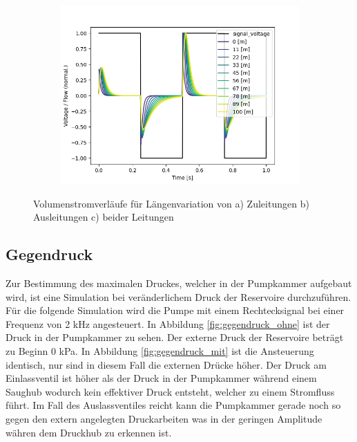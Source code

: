 \documentclass[fontsize=12pt, a4paper]{scrartcl}
\begin{document}
\begin{figure}[H]
\begin{subfigure}[H]{0.48\textwidth}
		\includegraphics[width=\textwidth, valign=t]{bilder/tubelength/tl_both_branch_multisweep_flow.png}
	\end{subfigure}
    \caption{Volumenstromverläufe für Längenvariation von a) Zuleitungen b) Ausleitungen c) beider Leitungen}
    \label{fig:sweepströme}
\end{figure}

\subsection{Gegendruck}

Zur Bestimmung des maximalen Druckes, welcher in der Pumpkammer aufgebaut wird, ist eine Simulation bei veränderlichem Druck der Reservoire durchzuführen. Für die folgende Simulation wird die Pumpe mit einem Rechtecksignal bei einer Frequenz von 2 kHz angesteuert. In Abbildung \ref{fig:gegendruck_ohne} ist der Druck in der Pumpkammer zu sehen. Der externe Druck der Reservoire beträgt zu Beginn 0 kPa. In Abbildung \ref{fig:gegendruck_mit} ist die Ansteuerung identisch, nur sind in diesem Fall die externen Drücke höher. Der Druck am Einlassventil ist höher als der Druck in der Pumpkammer während einem Saughub wodurch kein effektiver Druck entsteht, welcher zu einem Stromfluss führt. Im Fall des Auslassventiles reicht kann die Pumpkammer gerade noch so gegen den extern angelegten Druckarbeiten was in der geringen Amplitude währen dem Druckhub zu erkennen ist.
\end{document}
